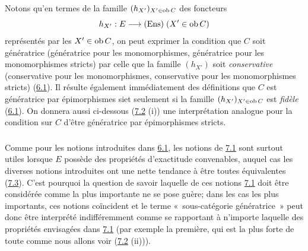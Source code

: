 \documentclass[10pt]{../fichiers-configuration-latex/smfart}
\begin{document}
\setcounter{subsection}{1} \setcounter{subsubsection}{0}
\subsubsection{}
Notons qu'en termes de la famille $(h_{X'})_{X'\in \operatorname{ob} C}$ des
foncteurs
$$
h_{X'}:E\longrightarrow (\operatorname{Ens})\; (X'\in \operatorname{ob} C)
$$
représentés par les $X'\in \operatorname{ob} C$, on peut exprimer la condition que
$C$ soit génératrice (\resp  génératrice pour les
monomorphismes,
\resp  génératrice pour les monomorphismes stricts) par celle que la
famille $(h_{X'})$ soit \emph{conservative} (\resp  conservative
pour les monomorphismes, \resp  conservative pour les monomorphismes
stricts) (\hyperref[I.def6.1]{6.1}). Il résulte également immédiatement des
définitions que $C$ est génératrice par épimorphismes
si\pageoriginale et seulement si la famille $(h_{X'})_{X'\in \operatorname{ob} C}$
est \emph{fidèle} (\hyperref[I.def6.1]{6.1}). On donnera aussi ci-dessous
(\hyperref[I.prop7.2]{7.2} (i)) une interprétation analogue pour la condition
sur $C$ d'être génératrice par épimorphismes stricts.

\subsubsection{}
Comme pour les notions introduites dans \hyperref[I.def6.1]{6.1}, les notions
de \hyperref[I.def7.1]{7.1} sont surtout utiles lorsque $E$ possède des
propriétés d'exactitude convenables, auquel cas les diverses notions
introduites ont une nette tendance à être toutes équivalentes
(\hyperref[I.cor7.3]{7.3}). C'est pourquoi la question de savoir laquelle de
ces notions \hyperref[I.def7.1]{7.1} doit être considérée comme la plus
importante ne se pose guère; dans les cas les plus importants, ces
notions coïncident et le terme « sous-catégorie
génératrice »
peut donc être interprété indifféremment comme se
rapportant à
n'importe laquelle des propriétés envisagées dans \hyperref[I.def7.1]{7.1}
(par exemple la première, qui est la plus forte de toute comme nous
allons voir (\hyperref[I.prop7.2]{7.2} (ii))).
\end{document}

